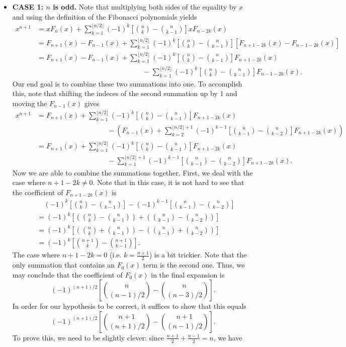 \documentclass[10pt]{article}
\begin{document}
\begin{enumerate}
\begin{itemize}

\item\textbf{CASE 1: $n$ is odd.}  Note that multiplying both sides of the equality by $x$ and using the definition of the Fibonacci polynomials yields \begin{align*}x^{n+1}&=xF_n(x)+\sum_{k=1}^{\lfloor n/2\rfloor}(-1)^k\left[\binom nk-\binom n{k-1}\right]xF_{n-2k}(x)\\&=F_{n+1}(x)-F_{n-1}(x)+\sum_{k=1}^{\lfloor n/2\rfloor}(-1)^k\left[\binom nk-\binom n{k-1}\right]\left[F_{n+1-2k}(x)-F_{n-1-2k}(x)\right]\\&=F_{n+1}(x)-F_{n-1}(x)+\sum_{k=1}^{\lfloor n/2\rfloor}(-1)^k\left[\binom nk-\binom n{k-1}\right]F_{n+1-2k}(x)\\&\hspace{15em}-\sum_{k=1}^{\lfloor n/2\rfloor}(-1)^k\left[\binom nk-\binom n{k-1}\right]F_{n-1-2k}(x).\end{align*} Our end goal is to combine these two summations into one.  To accomplish this, note that shifting the indeces of the second summation up by $1$ and moving the $F_{n-1}(x)$ gives \begin{align*}x^{n+1}&=F_{n+1}(x)+\sum_{k=1}^{\lfloor n/2\rfloor}(-1)^k\left[\binom nk-\binom n{k-1}\right]F_{n+1-2k}(x)\\&\hspace{10em}-\left(F_{n-1}(x)+\sum_{k=2}^{\lfloor n/2\rfloor+1}(-1)^{k-1}\left[\binom n{k-1}-\binom n{k-2}\right]F_{n+1-2k}(x)\right)\\&=F_{n+1}(x)+\sum_{k=1}^{\lfloor n/2\rfloor}(-1)^k\left[\binom nk-\binom n{k-1}\right]F_{n+1-2k}(x)\\&\hspace{10em}-\sum_{k=1}^{\lfloor n/2\rfloor+1}(-1)^{k-1}\left[\binom n{k-1}-\binom n{k-2}\right]F_{n+1-2k}(x).\end{align*} Now we are able to combine the summations together.  First, we deal with the case where $n+1-2k\neq 0$.  Note that in this case, it is not hard to see that the coefficient of $F_{n+1-2k}(x)$ is \begin{align*}&\quad(-1)^k\left[\binom nk-\binom n{k-1}\right]-(-1)^{k-1}\left[\binom n{k-1}-\binom n{k-2}\right]\\&=(-1)^k\left[\left(\binom nk-\binom n{k-1}\right)+\left(\binom n{k-1}-\binom n{k-2}\right)\right]\\&=(-1)^k\left[\left(\binom nk+\binom n{k-1}\right)-\left(\binom n{k-1}+\binom n{k-2}\right)\right]\\&=(-1)^k\left[\binom{n+1}k-\binom{n+1}{k-1}\right].\end{align*} The case where $n+1-2k=0$ (i.e. $k=\tfrac{n+1}2$) is a bit trickier.  Note that the only summation that contains an $F_0(x)$ term is the second one.  Thus, we may conclude that the coefficient of $F_0(x)$ in the final expansion is \[(-1)^{(n+1)/2}\left[\binom{n}{(n-1)/2}-\binom{n}{(n-3)/2}\right].\]  In order for our hypothesis to be correct, it suffices to show that this equals \[(-1)^{(n+1)/2}\left[\binom{n+1}{(n+1)/2}-\binom{n+1}{(n-1)/2}\right].\] To prove this, we need to be slightly clever: since $\tfrac{n+1}2+\tfrac{n-1}2=n$, we have 
\end{itemize}
\end{enumerate}
\end{document}
